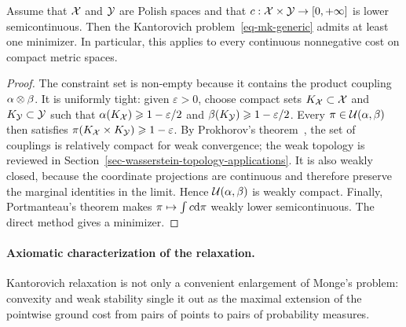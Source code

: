 \begin{prop}\label{prop-kantorovich-existence-compact}
		Assume that $\mathcal{X}$ and $\mathcal{Y}$ are Polish spaces and that $c:\mathcal{X}\times\mathcal{Y}\to[0,+\infty]$ is lower semicontinuous. Then the Kantorovich problem~\eqref{eq-mk-generic} admits at least one minimizer. In particular, this applies to every continuous nonnegative cost on compact metric spaces.
\end{prop}
\begin{proof}
		The constraint set is non-empty because it contains the product coupling $\alpha\otimes\beta$. It is uniformly tight: given $\varepsilon>0$, choose compact sets $K_{\mathcal{X}}\subset\mathcal{X}$ and $K_{\mathcal{Y}}\subset\mathcal{Y}$ such that $\alpha(K_{\mathcal{X}})\geqslant1-\varepsilon/2$ and $\beta(K_{\mathcal{Y}})\geqslant1-\varepsilon/2$. Every $\pi\in\mathcal{U}(\alpha,\beta)$ then satisfies
		\(\pi(K_{\mathcal{X}}\times K_{\mathcal{Y}})\geqslant1-\varepsilon\).
		By Prokhorov's theorem~\cite{bogachev2007measure,Villani09}, the set of couplings is relatively compact for weak convergence; the weak topology is reviewed in Section~\ref{sec-wasserstein-topology-applications}. It is also weakly closed, because the coordinate projections are continuous and therefore preserve the marginal identities in the limit. Hence $\mathcal{U}(\alpha,\beta)$ is weakly compact. Finally, Portmanteau's theorem makes $\pi\mapsto\int c\mathrm{d}\pi$ weakly lower semicontinuous. The direct method gives a minimizer.
\end{proof}

\paragraph{Axiomatic characterization of the relaxation.}

Kantorovich relaxation is not only a convenient enlargement of Monge's problem: convexity and weak stability single it out as the maximal extension of the pointwise ground cost from pairs of points to pairs of probability measures.

